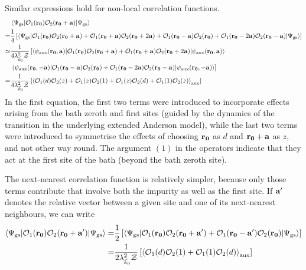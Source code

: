 \documentclass[reprint,hidelinks]{revtex4-2}
\begin{document}
Similar expressions hold for non-local correlation functions.
\begin{equation}\begin{aligned}
	\label{nonlocal_correlation}
	&\braket{\Psi_\text{gs} | \mathcal{O}_1({\bf r_0}) \mathcal{O}_2({\bf r_0} + {\bf a}) | \Psi_\text{gs}} \\
	=& \frac{1}{4}\left[\braket{\Psi_\text{gs} | \mathcal{O}_1({\bf r_0}) \mathcal{O}_2({\bf r_0} + {\bf a}) + \mathcal{O}_1({\bf r_0} + {\bf a}) \mathcal{O}_2({\bf r_0} + 2{\bf a}) + \mathcal{O}_1({\bf r_0} - {\bf a}) \mathcal{O}_2({\bf r_0}) + \mathcal{O}_1({\bf r_0} - 2{\bf a}) \mathcal{O}_2({\bf r_0} - {\bf a}) | \Psi_\text{gs}}\right]\\
	\simeq& \frac{1}{4\lambda_{\vec k_0}^2 \mathcal{Z}}\left[\braket{\psi_\text{aux}({\bf r_0}, {\bf a}) | \mathcal{O}_1({\bf r_0}) \mathcal{O}_2({\bf r_0} + {\bf a}) + \mathcal{O}_1({\bf r_0} + {\bf a}) \mathcal{O}_2({\bf r_0} + 2{\bf a}) | \psi_\text{aux}({\bf r_0}, {\bf a})} \right. \\
	      &\left.\braket{\psi_\text{aux}({\bf r_0}, -{\bf a}) | \mathcal{O}_1({\bf r_0} - {\bf a}) \mathcal{O}_2({\bf r_0}) + \mathcal{O}_1({\bf r_0} - 2{\bf a}) \mathcal{O}_2({\bf r_0} - {\bf a}) | \psi_\text{aux}({\bf r_0}, -{\bf a})}\right]\\
	=& \frac{1}{4\lambda_{\vec k_0}^2 \mathcal{Z}}\left[\braket{\mathcal{O}_1(d) \mathcal{O}_2(z) + \mathcal{O}_1(z) \mathcal{O}_2(1) + \mathcal{O}_1(z) \mathcal{O}_2(d) + \mathcal{O}_1(1) \mathcal{O}_2(z)}_\text{aux}\right]
\end{aligned}\end{equation}
In the first equation, the first two terms were introduced to incorporate effects arising from the bath zeroth and first sites (guided by the dynamics of the transition in the underlying extended Anderson model), while the last two terms were introduced to symmetrise the effects of choosing \({\bf r_0}\) as \(d\) and \({\bf r_0} + {\bf a}\) as \(z\), and not other way round. The argument \((1)\) in the operators indicate that they act at the first site of the bath (beyond the bath zeroth site).

The next-nearest correlation function is relatively simpler, because only those terms contribute that involve both the impurity as well as the first site. If \({\bf a}^\prime\) denotes the relative vector between a given site and one of its next-nearest neighbours, we can write
\begin{equation}\begin{aligned}
	\label{nnn_correlation}
	\braket{\Psi_\text{gs} | \mathcal{O}_1({\bf r_0}) \mathcal{O}_2({\bf r_0} + {\bf a}^\prime) | \Psi_\text{gs}} =& \frac{1}{2}\left[\braket{\Psi_\text{gs} | \mathcal{O}_1({\bf r_0}) \mathcal{O}_2({\bf r_0} + {\bf a}^\prime) + \mathcal{O}_1({\bf r_0} - {\bf a}^\prime) \mathcal{O}_2({\bf r_0}) | \Psi_\text{gs}}\right]\\
	=& \frac{1}{2\lambda_{\vec k_0}^2 \mathcal{Z}}\left[\braket{\mathcal{O}_1(d) \mathcal{O}_2(1) + \mathcal{O}_1(1) \mathcal{O}_2(d)}_\text{aux}\right]
\end{aligned}\end{equation}
\end{document}
